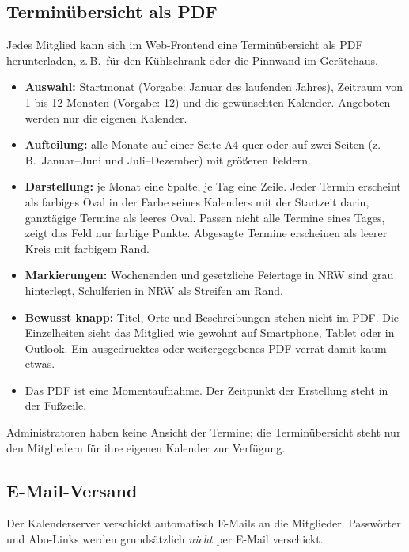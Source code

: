 \documentclass[a4paper,fontsize=10pt]{scrartcl}
\begin{document}
\subsection*{Terminübersicht als PDF}

Jedes Mitglied kann sich im Web-Frontend eine Terminübersicht als PDF
herunterladen, z.\,B.\ für den Kühlschrank oder die Pinnwand im Gerätehaus.

\begin{itemize}
  \item \textbf{Auswahl:} Startmonat (Vorgabe: Januar des laufenden Jahres),
        Zeitraum von 1 bis 12 Monaten (Vorgabe: 12) und die gewünschten
        Kalender. Angeboten werden nur die eigenen Kalender.
  \item \textbf{Aufteilung:} alle Monate auf einer Seite A4 quer oder auf zwei
        Seiten (z.\,B.\ Januar--Juni und Juli--Dezember) mit größeren Feldern.
  \item \textbf{Darstellung:} je Monat eine Spalte, je Tag eine Zeile. Jeder
        Termin erscheint als farbiges Oval in der Farbe seines Kalenders mit
        der Startzeit darin, ganztägige Termine als leeres Oval. Passen nicht
        alle Termine eines Tages, zeigt das Feld nur farbige Punkte. Abgesagte
        Termine erscheinen als leerer Kreis mit farbigem Rand.
  \item \textbf{Markierungen:} Wochenenden und gesetzliche Feiertage in NRW
        sind grau hinterlegt, Schulferien in NRW als Streifen am Rand.
  \item \textbf{Bewusst knapp:} Titel, Orte und Beschreibungen stehen nicht im
        PDF. Die Einzelheiten sieht das Mitglied wie gewohnt auf Smartphone,
        Tablet oder in Outlook. Ein ausgedrucktes oder weitergegebenes PDF
        verrät damit kaum etwas.
  \item Das PDF ist eine Momentaufnahme. Der Zeitpunkt der Erstellung steht
        in der Fußzeile.
\end{itemize}

Administratoren haben keine Ansicht der Termine; die Terminübersicht steht nur
den Mitgliedern für ihre eigenen Kalender zur Verfügung.

\subsection*{E-Mail-Versand}

Der Kalenderserver verschickt automatisch E-Mails an die Mitglieder.
Passwörter und Abo-Links werden grundsätzlich \emph{nicht} per E-Mail
verschickt.
\end{document}
